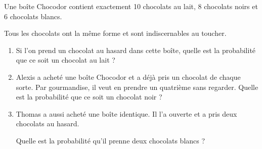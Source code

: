
\medskip

Une boîte \og Chocodor \fg{} contient exactement 10 chocolats au lait, 8 chocolats noirs et 6 chocolats blancs.

Tous les chocolats ont la même forme et sont indiscernables au toucher.

\medskip

\begin{enumerate}
\item Si l'on prend un chocolat au hasard dans cette boîte, quelle est la probabilité que ce soit un chocolat au lait ?
\item Alexis a acheté une boîte \og Chocodor\fg{} et a déjà pris un chocolat de chaque sorte. Par gourmandise, il veut en prendre un quatrième sans regarder. Quelle est la probabilité que ce soit un chocolat noir ?
\item Thomas a aussi acheté une boîte identique. Il l'a ouverte et a pris deux chocolats au hasard.

Quelle est la probabilité qu'il prenne deux chocolats blancs ?
\end{enumerate}

\vspace{0,5cm}

